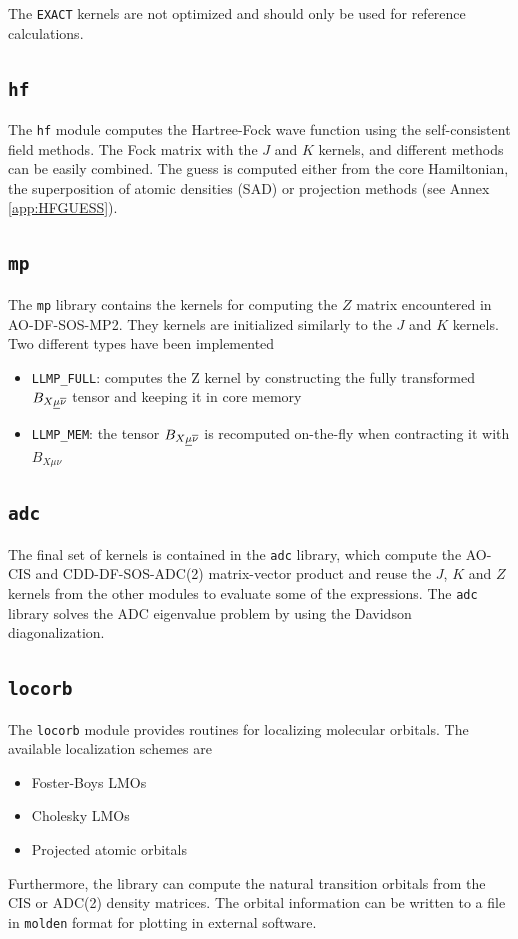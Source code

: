\noindent The \texttt{EXACT} kernels are not optimized and should only be used for reference calculations. 

\subsection{\texttt{hf}}

The \texttt{hf} module computes the Hartree-Fock wave function using the self-consistent field methods. The Fock matrix with the $J$ and $K$ kernels, and different methods can be easily combined. The guess is computed either from the core Hamiltonian, the superposition of atomic densities (SAD) or projection methods (see Annex \ref{app:HFGUESS}). 

\subsection{\texttt{mp}}

The \texttt{mp} library contains the kernels for computing the $Z$ matrix encountered in AO-DF-SOS-MP2. They kernels are initialized similarly to the $J$ and $K$ kernels. Two different types have been implemented 
\begin{itemize}
\item \texttt{LLMP\_FULL}: computes the Z kernel by constructing the fully transformed $B_{X\underline{\mu}\overline{\nu}}$ tensor and keeping it in core memory
\item \texttt{LLMP\_MEM}: the tensor $B_{X\underline{\mu}\overline{\nu}}$ is recomputed on-the-fly when contracting it with $B_{X\mu\nu}$
\end{itemize} 

\subsection{\texttt{adc}}

The final set of kernels is contained in the \texttt{adc} library, which compute the AO-CIS and CDD-DF-SOS-ADC(2) matrix-vector product and reuse the $J$, $K$ and $Z$ kernels from the other modules to evaluate some of the expressions. The \texttt{adc} library solves the ADC eigenvalue problem by using the Davidson diagonalization. 

\subsection{\texttt{locorb}}

The \texttt{locorb} module provides routines for localizing molecular orbitals. The available localization schemes are
\begin{itemize}
\item Foster-Boys LMOs 
\item Cholesky LMOs
\item Projected atomic orbitals
\end{itemize}
\noindent Furthermore, the library can compute the natural transition orbitals from the CIS or ADC(2) density matrices. The orbital information can be written to a file in \texttt{molden} format for plotting in external software. 

